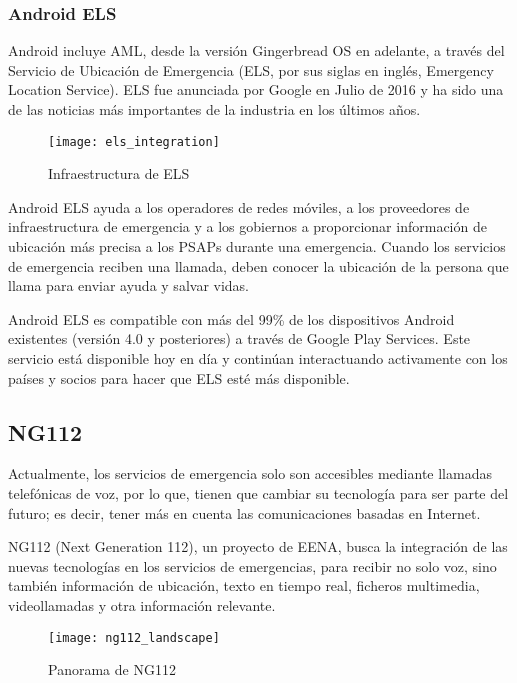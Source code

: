 \subsubsection{Android ELS}

Android incluye AML, desde la versión Gingerbread OS en adelante, a través del Servicio de Ubicación de Emergencia (ELS, por sus siglas en inglés, Emergency Location Service). ELS fue anunciada por Google en Julio de 2016 y ha sido una de las noticias más importantes de la industria en los últimos años.

\begin{figure}[htp!]
  \centering
  \texttt{[image: els\_integration]}
  \caption{Infraestructura de ELS}
  \label{fig:els_integration}
\end{figure}

Android ELS ayuda a los operadores de redes móviles, a los proveedores de infraestructura de emergencia y a los gobiernos a proporcionar información de ubicación más precisa a los PSAPs durante una emergencia. Cuando los servicios de emergencia reciben una llamada, deben conocer la ubicación de la persona que llama para enviar ayuda y salvar vidas.

Android ELS es compatible con más del 99\% de los dispositivos Android existentes (versión 4.0 y posteriores) a través de Google Play Services. Este servicio está disponible hoy en día y continúan interactuando activamente con los países y socios para hacer que ELS esté más disponible.

\subsection{NG112}

Actualmente, los servicios de emergencia solo son accesibles mediante llamadas telefónicas de voz, por lo que, tienen que cambiar su tecnología para ser parte del futuro; es decir, tener más en cuenta las comunicaciones basadas en Internet.

NG112 (Next Generation 112), un proyecto de EENA, busca la integración de las nuevas tecnologías en los servicios de emergencias, para recibir no solo voz, sino también información de ubicación, texto en tiempo real, ficheros multimedia, videollamadas y otra información relevante.

\begin{figure}[htp!]
  \centering
  \texttt{[image: ng112\_landscape]}
  \caption{Panorama de NG112}
  \label{fig:ng112_landscape}
\end{figure}

